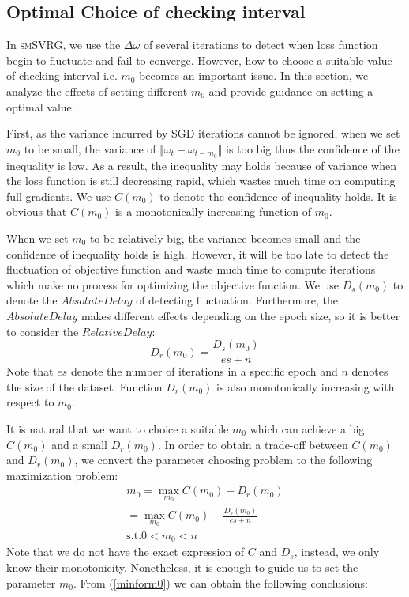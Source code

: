 \documentclass[conference]{IEEEtran}
\begin{document}
 \subsection{Optimal Choice of checking interval}
 \label{secOCCI}
 In \textsc{smSVRG}, we use the $\Delta\omega$ of several iterations to detect when loss function begin to fluctuate and fail to converge. However, how to choose a suitable value of checking interval i.e. $m_0$ becomes an important issue. In this section, we analyze the effects of setting different $m_0$ and provide guidance on setting a optimal value.
 
 First, as the variance incurred by SGD iterations cannot be ignored, when we set $m_0$ to be small, the variance of $\Vert\omega_{t}-\omega_{t-m_0}\Vert$ is too big thus the confidence of the inequality is low. As a result, the inequality may holds because of variance when the loss function is still decreasing rapid, which wastes much time on computing full gradients. We use $C(m_0)$ to denote the confidence of inequality holds. It is obvious that $C(m_0)$ is a monotonically increasing function of $m_0$.
 
 When we set $m_0$ to be relatively big, the variance becomes small and the confidence of inequality holds is high. However, it will be too late to detect the fluctuation of objective function and waste much time to compute iterations which make no process for optimizing the objective function. We use $D_s(m_0)$ to denote the $Absolute Delay$ of detecting fluctuation. Furthermore, the $Absolute Delay$ makes different effects depending on the epoch size, so it is better to consider the $Relative Delay$:
 $$D_r(m_0)=\frac{D_s(m_0)}{es+n}$$
 Note that $es$ denote the number of iterations in a specific epoch and $n$ denotes the size of the dataset. Function $D_r(m_0)$ is also monotonically increasing with respect to $m_0$.

It is natural that we want to choice a suitable $m_0$  which can achieve a big $C(m_0)$ and a small $D_r(m_0)$. In order to obtain a trade-off between $C(m_0)$ and $D_r(m_0)$, we convert the parameter choosing problem to the following maximization problem:
\begin{equation}
\label{minform0}
\begin{split}
m_0 = \max\limits_{m_0} C(m_0)-D_r(m_0)\\
 = \max\limits_{m_0} C(m_0)-\frac{D_s(m_0)}{es+n}\\
\textrm{s.t.} 0<m_0<n
\end{split}
\end{equation}
Note that we do not have the exact expression of $C$ and $D_s$, instead, we only know their monotonicity. Nonetheless, it is enough to guide us to set the parameter $m_0$. From (\ref{minform0}) we can obtain the following conclusions:
\end{document}
